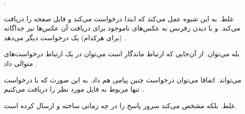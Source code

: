 \problem{}
.

\subproblem{}
غلط.
به این شیوه عمل می‌کند که ابتدا درخواست می‌کند و فایل 
صفحه را دریافت می‌کند. و با دیدن رفرنس به عکس‌های ناموجود
برای دریافت آن عکس‌ها نیز جداگانه (برای هرکدام) یک درخواست دیگر می‌دهد
.

\subproblem{} 
بله می‌توان. از آن‌جایی که ارتباط ماندگار است می‌توان در یک ارتباط درخواست‌های متوالی داد
.

\subproblem{}
می‌تواند. اتفاقا می‌توان درخواست چنین پیامی هم داد. به این صورت که با درخواست 
تنها 
مربوط به فایل مورد نظر را دریافت می‌کنیم
.

\subproblem{}
غلط.
بلکه مشخص می‌کند سرور پاسخ را در چه زمانی ساخته و ارسال کرده است.